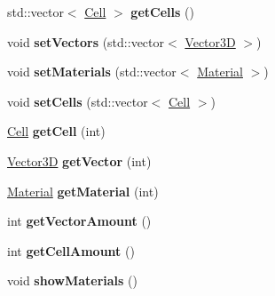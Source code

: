 \begin{DoxyCompactItemize}
\item 
std\+::vector$<$ \hyperlink{class_cell}{Cell} $>$ {\bfseries get\+Cells} ()\hypertarget{class_model_af1b55cd1a07b6ecf6858c78ebc3d56d0}{}\label{class_model_af1b55cd1a07b6ecf6858c78ebc3d56d0}

\item 
void {\bfseries set\+Vectors} (std\+::vector$<$ \hyperlink{class_vector3_d}{Vector3D} $>$)\hypertarget{class_model_a7e9d800350b33a82091373db395b05c6}{}\label{class_model_a7e9d800350b33a82091373db395b05c6}

\item 
void {\bfseries set\+Materials} (std\+::vector$<$ \hyperlink{class_material}{Material} $>$)\hypertarget{class_model_a48c4184a5a21e0f8682097624bad9060}{}\label{class_model_a48c4184a5a21e0f8682097624bad9060}

\item 
void {\bfseries set\+Cells} (std\+::vector$<$ \hyperlink{class_cell}{Cell} $>$)\hypertarget{class_model_a4aa2d9e458f8424cc56655d1528e03df}{}\label{class_model_a4aa2d9e458f8424cc56655d1528e03df}

\item 
\hyperlink{class_cell}{Cell} {\bfseries get\+Cell} (int)\hypertarget{class_model_a4a57497301bb2ab1d8dee7dfc1b7a240}{}\label{class_model_a4a57497301bb2ab1d8dee7dfc1b7a240}

\item 
\hyperlink{class_vector3_d}{Vector3D} {\bfseries get\+Vector} (int)\hypertarget{class_model_a6d877aa2a535c2a613fd92d6ef80b576}{}\label{class_model_a6d877aa2a535c2a613fd92d6ef80b576}

\item 
\hyperlink{class_material}{Material} {\bfseries get\+Material} (int)\hypertarget{class_model_a9dfba34e1752702d74e8c77e3f591b3f}{}\label{class_model_a9dfba34e1752702d74e8c77e3f591b3f}

\item 
int {\bfseries get\+Vector\+Amount} ()\hypertarget{class_model_acd0f324509ae2321c04f259fd0133a7a}{}\label{class_model_acd0f324509ae2321c04f259fd0133a7a}

\item 
int {\bfseries get\+Cell\+Amount} ()\hypertarget{class_model_a29b97b575c9ebfa2aaa9806cfa094f1e}{}\label{class_model_a29b97b575c9ebfa2aaa9806cfa094f1e}

\item 
void {\bfseries show\+Materials} ()\hypertarget{class_model_ae7b7dfcec56ec095782b672745f64c7e}{}\label{class_model_ae7b7dfcec56ec095782b672745f64c7e}


\end{DoxyCompactItemize}
